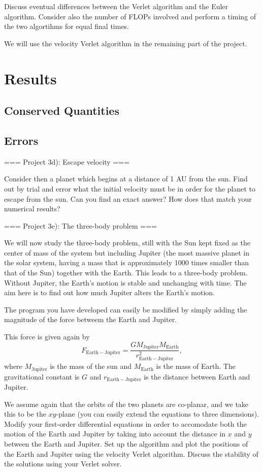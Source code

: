 \documentclass[11pt,a4paper]{article}
\begin{document}
Discuss eventual differences between the Verlet algorithm and the Euler algorithm. Consider also the number of FLOPs involved and perform a timing of the
two algortihms for equal final times.

We will use the velocity Verlet algorithm in the remaining part of the project. 
\section{Results}
\subsection{Conserved Quantities}
\subsection{Errors}

=== Project 3d): Escape velocity ===

Consider then a planet which begins at a distance of 1 AU from the sun. Find out by trial and error
what the initial velocity must be in order for the planet to escape from the sun.  Can you find an exact answer?  How does that match your numerical results?

=== Project 3e): The three-body problem ===

We will now study the three-body problem, still with the Sun kept fixed as the center of mass of the system  but 
including Jupiter (the most massive planet in the solar system, having a mass that is approximately 1000 times
smaller than that of the Sun) together with the Earth. This leads to a three-body problem. Without Jupiter, the Earth's motion is stable and unchanging with time. The aim here is to find out how much Jupiter alters the Earth's motion.

The program you have developed can easily be modified by simply adding the magnitude of the force betweem the Earth and Jupiter.

This force is given again by 
\[
F_{\mathrm{Earth-Jupiter}}=\frac{GM_{\mathrm{Jupiter}}M_{\mathrm{Earth}}}{r_{\mathrm{Earth-Jupiter}}^2},
\]
where $M_{\mathrm{Jupiter}}$ is the mass of the sun and $M_{\mathrm{Earth}}$ is the mass of Earth. 
The gravitational constant is $G$ and $r_{\mathrm{Earth-Jupiter}}$ is the distance between Earth and Jupiter.

We assume again that the orbits of the two planets are co-planar, and we take this to be the $xy$-plane (you can easily extend the equations to three dimensions). 
Modify your first-order differential equations in order to accomodate both the
motion of the Earth and Jupiter by taking into account the distance in $x$ and
$y$ between the Earth and Jupiter. Set up the algorithm and plot the positions of the Earth and Jupiter using the velocity Verlet algorithm.
Discuss the stability of the solutions using your Verlet solver.
\end{document}
